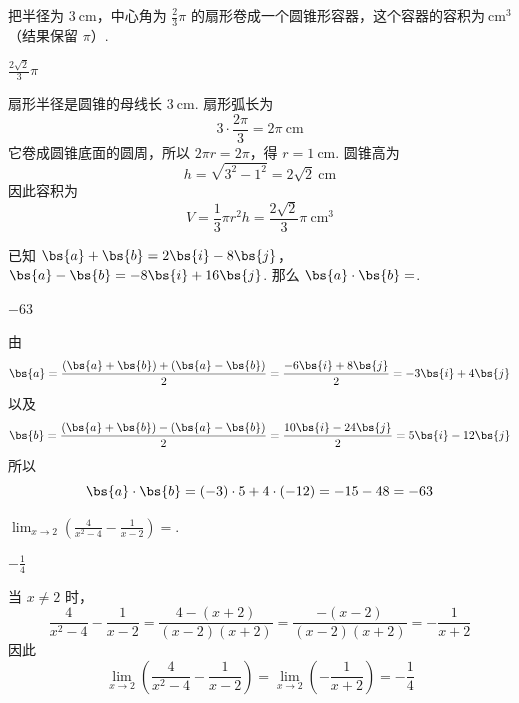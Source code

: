 \documentclass[UTF8,a4paper,oneside,11pt]{ctexbook}
\begin{document}
\begin{problem}[A]
把半径为 \(3\mathrm{~cm}\)，中心角为 \(\frac{2}{3}\pi\) 的扇形卷成一个圆锥形容器，这个容器的容积为\fillinblank{}\(\mathrm{~cm}^3\)（结果保留 \(\pi\)）.
\end{problem}

\begin{answer}
\(\frac{2\sqrt{2}}{3}\pi\)
\end{answer}

\begin{solution}
扇形半径是圆锥的母线长 \(3\mathrm{~cm}\). 扇形弧长为
\[
3\cdot\frac{2\pi}{3}=2\pi\mathrm{~cm}
\]
它卷成圆锥底面的圆周，所以 \(2\pi r=2\pi\)，得 \(r=1\mathrm{~cm}\). 圆锥高为
\[
h=\sqrt{3^2-1^2}=2\sqrt{2}\mathrm{~cm}
\]
因此容积为
\[
V=\frac{1}{3}\pi r^2h=\frac{2\sqrt{2}}{3}\pi\mathrm{~cm}^3
\]
\end{solution}

\setcounter{probnum}{14}
\begin{problem}[B]
已知 \(\bs{a}+\bs{b}=2\bs{i}-8\bs{j}\)，\(\bs{a}-\bs{b}=-8\bs{i}+16\bs{j}\). 那么 \(\bs{a}\cdot\bs{b}=\)\fillinblank{}.
\end{problem}

\begin{answer}
\(-63\)
\end{answer}

\begin{solution}
由
\[
\bs{a}=\frac{(\bs{a}+\bs{b})+(\bs{a}-\bs{b})}{2}
=\frac{-6\bs{i}+8\bs{j}}{2}
=-3\bs{i}+4\bs{j}
\]
以及
\[
\bs{b}=\frac{(\bs{a}+\bs{b})-(\bs{a}-\bs{b})}{2}
=\frac{10\bs{i}-24\bs{j}}{2}
=5\bs{i}-12\bs{j}
\]
所以
\[
\bs{a}\cdot\bs{b}=(-3)\cdot5+4\cdot(-12)=-15-48=-63
\]
\end{solution}

\begin{problem}[B]
\(\displaystyle\lim_{x\to 2}\left(\frac{4}{x^2-4}-\frac{1}{x-2}\right)=\)\fillinblank{}.
\end{problem}

\begin{answer}
\(-\frac{1}{4}\)
\end{answer}

\begin{solution}
当 \(x\ne2\) 时，
\[
\frac{4}{x^2-4}-\frac{1}{x-2}
=\frac{4-(x+2)}{(x-2)(x+2)}
=\frac{-(x-2)}{(x-2)(x+2)}
=-\frac{1}{x+2}
\]
因此
\[
\lim_{x\to2}\left(\frac{4}{x^2-4}-\frac{1}{x-2}\right)
=\lim_{x\to2}\left(-\frac{1}{x+2}\right)
=-\frac{1}{4}
\]
\end{solution}
\end{document}
